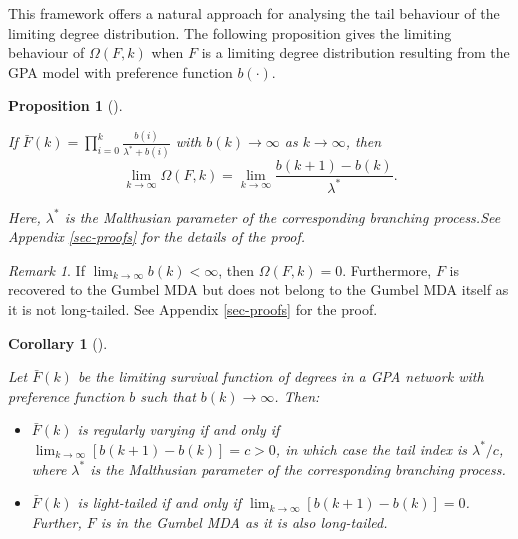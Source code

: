 \documentclass[
  sn-basic,
  10pt,
]{sn-jnl}
\theoremstyle{plain}
\newtheorem{corollary}{Corollary}[section]
\theoremstyle{plain}
\newtheorem{proposition}{Proposition}[section]
\theoremstyle{remark}
\newtheorem{refremark}{Remark}[section]
\begin{document}
This framework offers a natural approach for analysing the tail
behaviour of the limiting degree distribution. The following proposition
gives the limiting behaviour of \(\Omega(F,k)\) when \(F\) is a limiting
degree distribution resulting from the GPA model with preference
function \(b(\cdot)\).

\begin{proposition}[]\protect\hypertarget{prp-omega}{}\label{prp-omega}

If \(\bar F(k) = \prod_{i=0}^k\frac{b(i)}{\lambda^* + b(i)}\) with
\(b(k) \rightarrow \infty\) as \(k\rightarrow \infty\), then \[
\lim_{k\rightarrow\infty}\Omega(F,k) = \lim_{k\rightarrow\infty}\frac{b(k+1)-b(k)}{\lambda^*}.
\]

Here, \(\lambda^*\) is the Malthusian parameter of the corresponding
branching process.See Appendix \ref{sec-proofs} for the details of the
proof.

\end{proposition}

\begin{refremark}
If \(\lim_{k\rightarrow\infty}b(k)<\infty\), then \(\Omega(F, k) = 0\).
Furthermore, \(F\) is recovered to the Gumbel MDA but does not belong to
the Gumbel MDA itself as it is not long-tailed. See Appendix
\ref{sec-proofs} for the proof.

\label{rem-omega}

\end{refremark}

\begin{corollary}[]\protect\hypertarget{cor-omega2}{}\label{cor-omega2}

Let \(\bar F (k)\) be the limiting survival function of degrees in a GPA
network with preference function \(b\) such that
\(b(k)\rightarrow\infty\). Then:

\begin{itemize}
\item
  \(\bar F(k)\) is regularly varying if and only if
  \(\lim_{k\rightarrow\infty}[b(k+1)-b(k)]=c>0\), in which case the tail
  index is \(\lambda^*/c\), where \(\lambda^*\) is the Malthusian
  parameter of the corresponding branching process.
\item
  \(\bar F(k)\) is light-tailed if and only if
  \(\lim_{k\rightarrow\infty}[b(k+1)-b(k)]=0\). Further, \(F\) is in the
  Gumbel MDA as it is also long-tailed.
\end{itemize}

\end{corollary}
\end{document}
